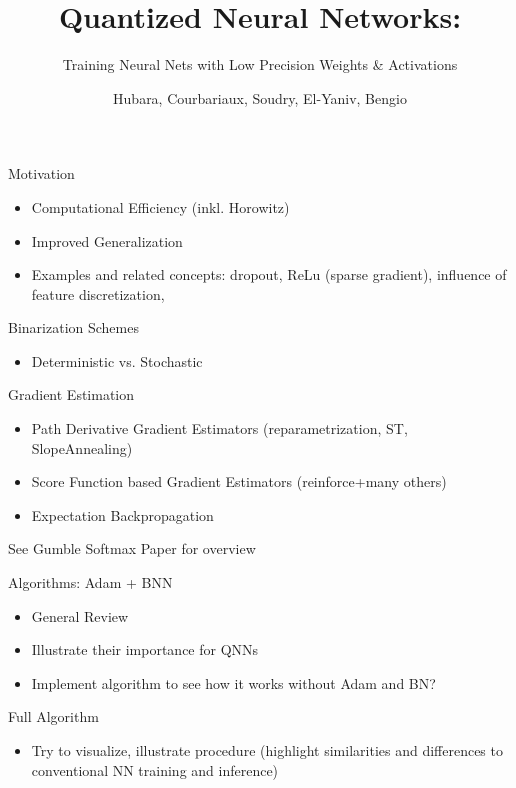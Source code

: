 \documentclass{beamer}
\title[Qunatized Neural Networks]{Quantized Neural Networks:}
\subtitle{Training Neural Nets with Low Precision Weights \& Activations}
\author{Hubara, Courbariaux, Soudry, El-Yaniv, Bengio}
\institute{}
\date{}
\begin{document}
\begin{frame}
\titlepage
\end{frame}

\begin{frame}{Motivation}
    \begin{itemize}
        \item Computational Efficiency (inkl. Horowitz)
        \item Improved Generalization
        \item Examples and related concepts: dropout, ReLu (sparse gradient),
        influence of feature discretization, 
    \end{itemize}
\end{frame}

\begin{frame}{Binarization Schemes}
    \begin{itemize}
        \item Deterministic vs. Stochastic
    \end{itemize}
\end{frame}

\begin{frame}{Gradient Estimation}
    \begin{itemize}
        \item Path Derivative Gradient Estimators (reparametrization, ST,
        SlopeAnnealing)
        \item Score Function based Gradient Estimators (reinforce+many others)
        \item Expectation Backpropagation
    \end{itemize}
    See Gumble Softmax Paper for overview
\end{frame}

\begin{frame}{Algorithms: Adam + BNN}
    \begin{itemize}
        \item General Review
        \item Illustrate their importance for QNNs
        \item Implement algorithm to see how it works without Adam and BN?
    \end{itemize}
\end{frame}

\begin{frame}{Full Algorithm}
    \begin{itemize}
        \item Try to visualize, illustrate procedure (highlight similarities and
        differences to conventional NN training and inference)
    \end{itemize}
\end{frame}
\end{document}
